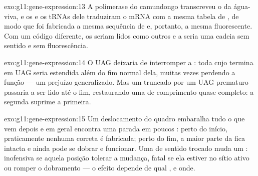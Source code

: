 \begin{solution}{exo:g11:gene-expression:13}
A  polimerase do camundongo transcreveu o  da água-viva, e os
 e os tRNAs dele traduziram o mRNA com a mesma tabela de
, de modo que foi fabricada a mesma sequência de  e,
portanto, a mesma  fluorescente. Com um código diferente, os
 seriam lidos como outros  e a  seria uma
cadeia sem sentido e sem fluorescência.
\end{solution}

\begin{solution}{exo:g11:gene-expression:14}
O UAG deixaria de interromper a : toda  cujo 
termina em UAG seria estendida além do fim normal dela, muitas vezes
perdendo a função --- um prejuízo generalizado. Mas um  truncado
por um UAG prematuro passaria a ser lido até o fim, restaurando uma
 de comprimento quase completo: a segunda  suprime a
primeira.
\end{solution}

\begin{solution}{exo:g11:gene-expression:15}
Um deslocamento do quadro embaralha tudo o que vem depois e em geral
encontra uma parada em poucos : perto do início, praticamente
nenhuma  correta é fabricada; perto do fim, a maior parte da
 fica intacta e ainda pode se dobrar e funcionar. Uma 
de sentido trocado muda um : inofensiva se aquela posição
tolerar a mudança, fatal se ela estiver no sítio ativo ou romper o
dobramento --- o efeito depende de qual , e onde.
\end{solution}

